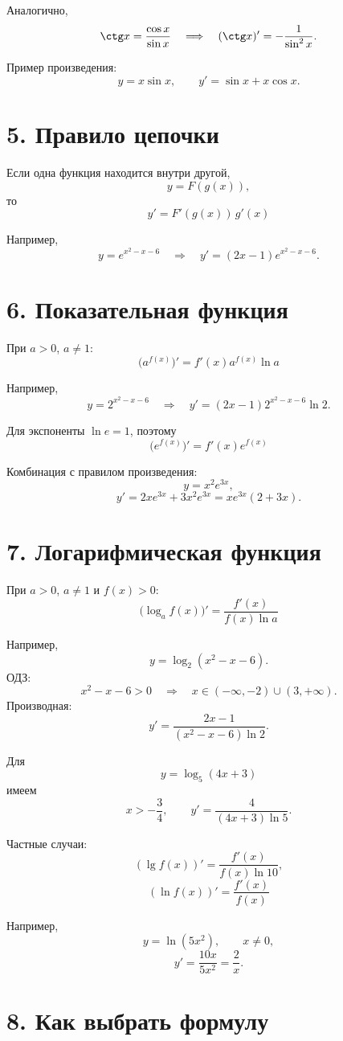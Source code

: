 \documentclass[a4paper,12pt]{article}
\newcommand{\sectionline}{\vspace{0.25em}{\color{accent}\rule{\linewidth}{0.8pt}}\vspace{0.45em}}
\newcommand{\keyformula}[1]{\[\boxed{\displaystyle #1}\]}
\begin{document}
Аналогично,
\[
\ctg x=\frac{\cos x}{\sin x}
\quad\Longrightarrow\quad
(\ctg x)'=-\frac1{\sin^2x}.
\]

Пример произведения:
\[
y=x\sin x,
\qquad
y'=\sin x+x\cos x.
\]

\section*{\color{darkaccent}5. Правило цепочки}
\sectionline

Если одна функция находится внутри другой,
\[
y=F(g(x)),
\]
то
\keyformula{y'=F'(g(x))\,g'(x)}

Например,
\[
y=e^{x^2-x-6}
\quad\Longrightarrow\quad
 y'=(2x-1)e^{x^2-x-6}.
\]

\section*{\color{darkaccent}6. Показательная функция}
\sectionline

При $a>0$, $a\ne1$:
\keyformula{\bigl(a^{f(x)}\bigr)'=f'(x)a^{f(x)}\ln a}

Например,
\[
y=2^{x^2-x-6}
\quad\Longrightarrow\quad
 y'=(2x-1)2^{x^2-x-6}\ln2.
\]

Для экспоненты $\ln e=1$, поэтому
\keyformula{\bigl(e^{f(x)}\bigr)'=f'(x)e^{f(x)}}

Комбинация с правилом произведения:
\[
y=x^2e^{3x},
\]
\[
y'=2xe^{3x}+3x^2e^{3x}=xe^{3x}(2+3x).
\]

\section*{\color{darkaccent}7. Логарифмическая функция}
\sectionline

При $a>0$, $a\ne1$ и $f(x)>0$:
\keyformula{\bigl(\log_a f(x)\bigr)'=\frac{f'(x)}{f(x)\ln a}}

Например,
\[
y=\log_2(x^2-x-6).
\]
ОДЗ:
\[
x^2-x-6>0
\quad\Longrightarrow\quad
x\in(-\infty,-2)\cup(3,+\infty).
\]
Производная:
\[
y'=\frac{2x-1}{(x^2-x-6)\ln2}.
\]

Для
\[
y=\log_5(4x+3)
\]
имеем
\[
x>-\frac34,
\qquad
 y'=\frac4{(4x+3)\ln5}.
\]

Частные случаи:
\[
(\lg f(x))'=\frac{f'(x)}{f(x)\ln10},
\]
\keyformula{(\ln f(x))'=\frac{f'(x)}{f(x)}}

Например,
\[
y=\ln(5x^2),\qquad x\ne0,
\]
\[
y'=\frac{10x}{5x^2}=\frac2x.
\]

\section*{\color{darkaccent}8. Как выбрать формулу}
\sectionline
\end{document}
